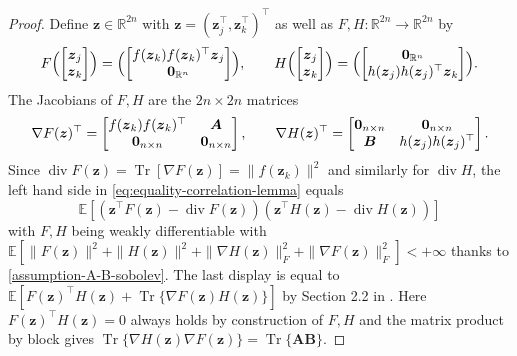 \documentclass[11pt]{amsart}
\numberwithin{equation}{section}
\numberwithin{equation}{section}
\def\real{{\mathbb{R}}}
\def\R{{\real}}
\def\E{{\mathbb{E}}}
\DeclareMathOperator{\trace}{Tr}
\def\mathbold{\boldsymbol} %
\def\bA{\mathbold{A}}\def\calA{{\cal A}}\def\scrA{{\mathscr A}}\def\Ahat{\widehat{A}}\def\Atil{{\widetilde A}}
\def\bB{\mathbold{B}}\def\calB{{\cal B}}\def\scrB{{\mathscr B}}\def\Bhat{\widehat{B}}\def\Btil{{\widetilde B}}
\def\bz{\mathbold{z}}\def\zhat{\widehat{z}}\def\ztil{\widetilde{z}}\def\zbar{{\overline z}}
\def\calB{{\mathscr B}}
\DeclareMathOperator{\dv}{div}
\begin{document}
\begin{proof}
    Define $\bz\in\R^{2n}$ with $\bz=(\bz_j^\top, \bz_k^\top)^\top$
    as well as $F,H:\R^{2n}\to \R^{2n}$ by
    $$
    F\Bigl(\begin{bmatrix}\bz_j \\\bz_k\end{bmatrix}\Bigr)
    =\Bigl( \begin{bmatrix}f(\bz_k)  f(\bz_k)^\top\bz_j \\ {\bf 0}_{\R^n} 
    \end{bmatrix}
        \Bigr),
    \qquad
    H\Bigl(\begin{bmatrix}\bz_j \\\bz_k \end{bmatrix}\Bigr)
    =\Bigl( \begin{bmatrix} {\bf 0}_{\R^n} \\  h(\bz_j) h(\bz_j)^\top\bz_k
    \end{bmatrix}\Bigr).$$
    The Jacobians of $F, H$ are the $2n\times 2n$ matrices 
    \[
        \nabla F(\bz)^\top =
    \begin{bmatrix}
        f(\bz_k) f(\bz_k)^\top & \bA \\
     {\bf 0}_{n\times n} & {\bf 0}_{n\times n}
    \end{bmatrix}
    ,
    \qquad
    \nabla H(\bz)^\top =
    \begin{bmatrix}
    {\bf 0}_{n\times n} & {\bf 0}_{n\times n} \\
    \bB & h(\bz_j) h(\bz_j)^\top
    \end{bmatrix}
    .
    \]
    Since $\dv F(\bz)= \trace[\nabla F(\bz)]
    = \|f(\bz_k)\|^2$ and similarly for $\dv H$,
    the left hand side in \eqref{eq:equality-correlation-lemma} equals
    $$
    \E[(\bz^\top F(\bz) - \dv F(\bz))(\bz^\top H(\bz) - \dv H(\bz))]
    $$
    with $F,H$ being weakly differentiable with
    $\E[\|F(\bz)\|^2 + \|H(\bz)\|^2 + \|\nabla H(\bz)\|_F^2 + \|\nabla F(\bz)\|_F^2]
    < +\infty$
    thanks to \eqref{assumption-A-B-sobolev}.
    The last display is equal to
    $\E[F(\bz)^\top H(\bz) + \trace \{\nabla F(\bz) H(\bz)\}]$
    by Section 2.2 in \cite{bellec_zhang2018second_stein}.
    Here $F(\bz)^\top H(\bz)=0$ always holds by construction of $F,H$
    and the matrix product by block gives
    $\trace \{ \nabla H(\bz) \nabla F(\bz)\} = \trace \{\bA \bB\}$.


\end{proof}
\end{document}
